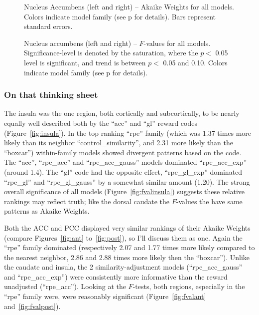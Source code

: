 \begin{figure}[tp]
    \centering
    \caption{Nucleus Accumbens (left and right) -- Akaike Weights for all models.  Colors indicate model family (see p\pageref{sub:cmb} for details). Bars represent standard errors.}
    \label{fig:accumbens}
\end{figure}
\begin{figure}[tp]
    \centering
    \caption{Nucleus accumbens (left and right) -- $F$-values for all models.
    Significance-level is denoted by the saturation, where the $p <$ 0.05 level is
    significant, and trend is between $p <$ 0.05 and 0.10.  Colors indicate model family (see p\pageref{sub:cmb} for details).}
    \label{fig:fvalaccumbens}
\end{figure}

\subsubsection{On that thinking sheet}
\label{subsub:onsheet}
The insula was the one region, both cortically and subcortically, to be nearly equally well described both by the ``acc'' and ``gl'' reward codes (Figure~\ref{fig:insula}).  In the top ranking ``rpe'' family (which was 1.37 times more likely than its neighbor ``control\_similarity'', and 2.31 more likely than the ``boxcar'') within-family models showed divergent patterns based on the code.  The ``acc'', ``rpe\_acc'' and ``rpe\_acc\_gauss'' models dominated ``rpe\_acc\_exp'' (around 1.4).  The ``gl'' code had the opposite effect, ``rpe\_gl\_exp'' dominated ``rpe\_gl'' and ``rpe\_gl\_gauss'' by a somewhat similar amount (1.20).  The strong overall significance of all models (Figure~\ref{fig:fvalinsula}) suggests these relative rankings may reflect truth; like the dorsal caudate the $F$-values the have same patterns as Akaike Weights.

Both the ACC and PCC displayed very similar rankings of their Akaike Weights (compare Figures~\ref{fig:ant} to~\ref{fig:post}), so I'll discuss them as one.  Again the ``rpe'' family dominated (respectively 2.07 and 1.77 times more likely compared to the nearest neighbor, 2.86 and 2.88 times more likely then the ``boxcar'').  Unlike the caudate and insula, the 2 similarity-adjustment models (``rpe\_acc\_gauss'' and ``rpe\_acc\_exp'') were consistently more informative than the reward unadjusted (``rpe\_acc'').  Looking at the $F$-tests, both regions, especially in the ``rpe'' family were, were reasonably significant (Figure~\ref{fig:fvalant} and~\ref{fig:fvalpost}).

